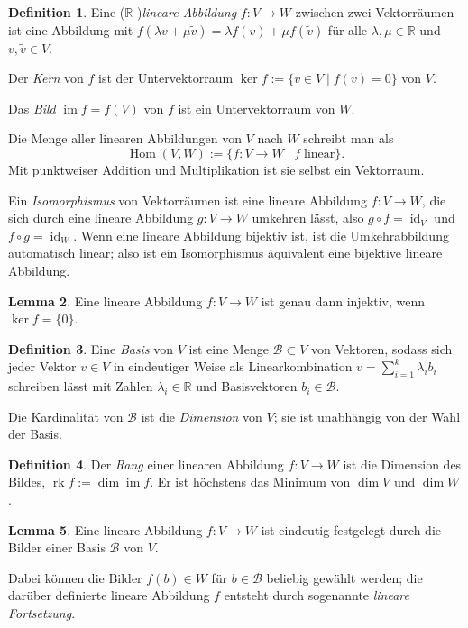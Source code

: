 \documentclass[a4paper]{scrbook}
\numberwithin{equation}{chapter}
\DeclareMathOperator{\id}{id}
\DeclareMathOperator{\Hom}{Hom}
\DeclareMathOperator{\im}{im}
\DeclareMathOperator{\rk}{rk}
\newcommand{\R}{\mathbb{R}}
\theoremstyle{definition}
\newtheorem{defn}{Definition}[section]
\newtheorem{lemma}[defn]{Lemma}
\begin{document}
\begin{defn}
	Eine ($\R$-)\emph{lineare Abbildung} $f\colon V\to W$ zwischen zwei Vektorräumen ist eine Abbildung mit $f(\lambda v + \mu \tilde v) = \lambda f(v) + \mu f(\tilde v)$ für alle $\lambda,\mu \in \R$ und $v,\tilde v \in V$.

	Der \emph{Kern} von $f$ ist der Untervektorraum $\ker f := \{v \in V \mid f(v) = 0\}$ von $V$.

	Das \emph{Bild} $\im f = f(V)$ von $f$ ist ein Untervektorraum von $W$.

	Die Menge aller linearen Abbildungen von $V$ nach $W$ schreibt man als
	\[\Hom(V,W) := \{f\colon V \to W \mid f \; \text{linear}\}.\]
	Mit punktweiser Addition und Multiplikation ist sie selbst ein Vektorraum.
	
	Ein \emph{Isomorphismus} von Vektorräumen ist eine lineare Abbildung $f\colon V\to W$, die sich durch eine lineare Abbildung $g\colon V\to W$ umkehren lässt, also $g\circ f = \id_V$ und $f\circ g = \id_W$. Wenn eine lineare Abbildung bijektiv ist, ist die Umkehrabbildung automatisch linear; also ist ein Isomorphismus äquivalent eine bijektive lineare Abbildung.
\end{defn}

\begin{lemma}
	Eine lineare Abbildung $f\colon V \to W$ ist genau dann injektiv, wenn $\ker f = \{0\}$.
\end{lemma}

\begin{defn}
	Eine \emph{Basis} von $V$ ist eine Menge $\mathcal B \subset V$ von Vektoren, sodass sich jeder Vektor $v \in V$ in eindeutiger Weise als Linearkombination $v = \sum_{i=1}^k \lambda_i b_i$ schreiben lässt mit Zahlen $\lambda_i \in \R$ und Basisvektoren $b_i \in \mathcal B$.

	Die Kardinalität von $\mathcal B$ ist die \emph{Dimension} von $V$; sie ist unabhängig von der Wahl der Basis.
\end{defn}

\begin{defn}
	Der \emph{Rang} einer linearen Abbildung $f\colon V\to W$ ist die Dimension des Bildes, $\rk f := \dim\im f$. Er ist höchstens das Minimum von $\dim V$ und $\dim W$.
\end{defn}

\begin{lemma}
	Eine lineare Abbildung $f\colon V\to W$ ist eindeutig festgelegt durch die Bilder einer Basis $\mathcal B$ von $V$.

	Dabei können die Bilder $f(b)\in W$ für $b \in \mathcal B$ beliebig gewählt werden; die darüber definierte lineare Abbildung $f$ entsteht durch sogenannte \emph{lineare Fortsetzung}.
\end{lemma}
\end{document}
